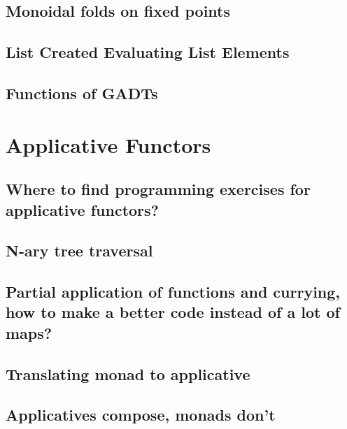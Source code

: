 \documentclass{book}
\begin{document}
\section{Monoidal folds on fixed points}


\section{List Created Evaluating List Elements}


\section{Functions of GADTs}



\chapter{Applicative Functors}

\section{Where to find programming exercises for applicative functors?}


\section{N-ary tree traversal}


\section{Partial application of functions and currying, how to make a better code instead of a lot of maps?}


\section{Translating monad to applicative}


\section{Applicatives compose, monads don't}

\end{document}

